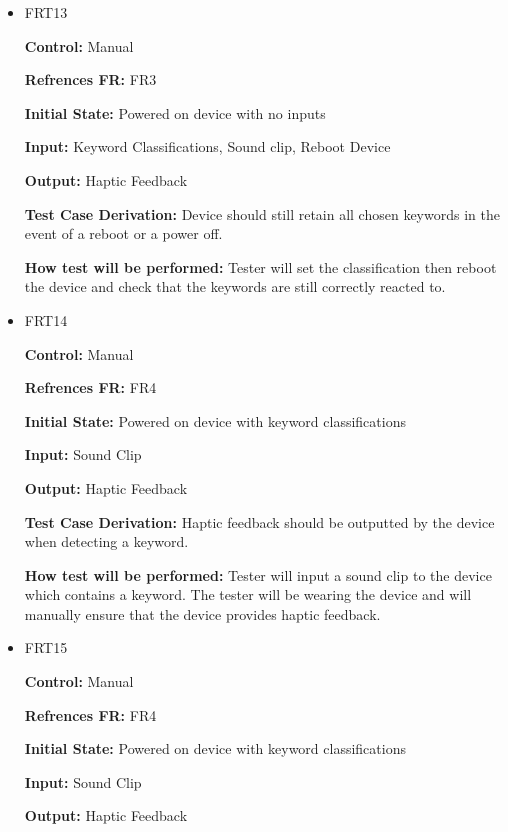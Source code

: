 \documentclass[12pt, titlepage]{article}
\begin{document}
\begin{itemize}
\item{FRT13}

\textbf{Control:} Manual

\textbf{Refrences FR:} FR3 					

\textbf{Initial State:} Powered on device with no inputs
					
\textbf{Input:} Keyword Classifications, Sound clip, Reboot Device
					
\textbf{Output:} Haptic Feedback

\textbf{Test Case Derivation:} Device should still retain all chosen keywords in the event of a reboot or a power off.
					
\textbf{How test will be performed:} Tester will set the classification then reboot the device and check that the keywords are still correctly reacted to. 


\item{FRT14}

\textbf{Control:} Manual

\textbf{Refrences FR:} FR4 					

\textbf{Initial State:} Powered on device with keyword classifications
					
\textbf{Input:} Sound Clip
					
\textbf{Output:} Haptic Feedback

\textbf{Test Case Derivation:} Haptic feedback should be outputted by the device when detecting a keyword.
					
\textbf{How test will be performed:} Tester will input a sound clip to the device which contains a keyword. The tester will be wearing the device and will manually ensure that the device provides haptic feedback. 


\item{FRT15}

\textbf{Control:} Manual

\textbf{Refrences FR:} FR4 					

\textbf{Initial State:} Powered on device with keyword classifications
					
\textbf{Input:} Sound Clip
					
\textbf{Output:} Haptic Feedback


\end{itemize}
\end{document}
